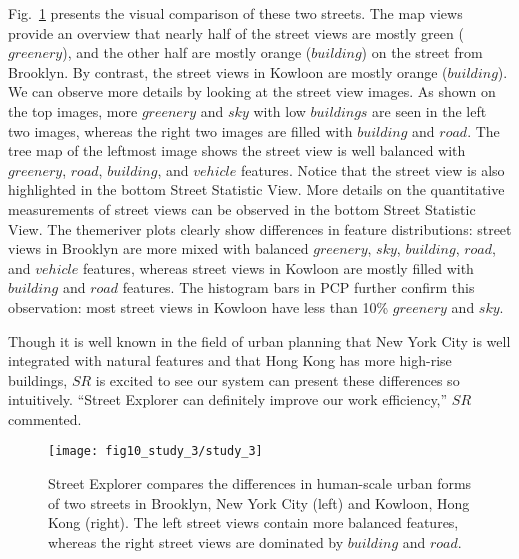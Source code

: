 Fig.~\ref{fig:study_3} presents the visual comparison of these two streets.
The map views provide an overview that nearly half of the street views are mostly green ($greenery$), and the other half are mostly orange ($building$) on the street from Brooklyn.
By contrast, the street views in Kowloon are mostly orange ($building$).
We can observe more details by looking at the street view images.
As shown on the top images, more $greenery$ and $sky$ with low $buildings$ are seen in the left two images, whereas the right two images are filled with $building$ and $road$.
The tree map of the leftmost image shows the street view is well balanced with $greenery$, $road$, $building$, and $vehicle$ features.
Notice that the street view is also highlighted in the bottom Street Statistic View.
More details on the quantitative measurements of street views can be observed in the bottom Street Statistic View.
The themeriver plots clearly show differences in feature distributions:
street views in Brooklyn are more mixed with balanced $greenery$, $sky$, $building$, $road$, and $vehicle$ features, whereas street views in Kowloon are mostly filled with $building$ and $road$ features.
The histogram bars in PCP further confirm this observation: most street views in Kowloon have less than 10\% $greenery$ and $sky$.

Though it is well known in the field of urban planning that New York City is well integrated with natural features and that Hong Kong has more high-rise buildings, $SR$ is excited to see our system can present these differences so intuitively.
``Street Explorer can definitely improve our work efficiency,'' $SR$ commented.


\begin{figure}[t]
	\centering
	\texttt{[image: fig10\_study\_3/study\_3]}
	\vspace{-4mm}
	\caption{Street Explorer compares the differences in human-scale urban forms of two streets in Brooklyn, New York City (left) and Kowloon, Hong Kong (right).
	The left street views contain more balanced features, whereas the right street views are dominated by $building$ and $road$.}
	\label{fig:study_3}
	\vspace{-4mm}
\end{figure}
